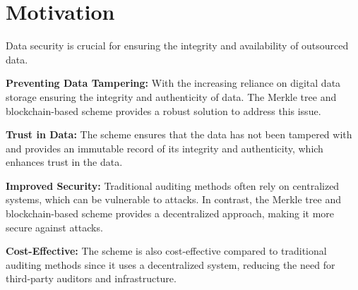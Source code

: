\section{Motivation}
\large
Data security is crucial for ensuring the integrity and availability of outsourced data.

\textbf{Preventing Data Tampering:}  With the increasing reliance on digital data storage ensuring the integrity and authenticity of data. The Merkle tree and blockchain-based scheme provides a robust solution to address this issue. 

\textbf{Trust in Data: }The scheme ensures that the data has not been tampered with and provides an immutable record of its integrity and authenticity, which enhances trust in the data.

\textbf{Improved Security: }Traditional auditing methods often rely on centralized systems, which can be vulnerable to attacks. In contrast, the Merkle tree and blockchain-based scheme provides a decentralized approach, making it more secure against attacks.

\textbf{Cost-Effective:} The scheme is also cost-effective compared to traditional auditing methods since it uses a decentralized system, reducing the need for third-party auditors and infrastructure.